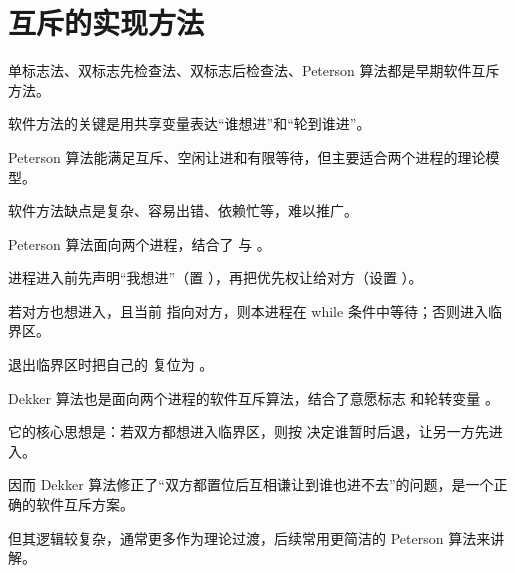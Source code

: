 \section{互斥的实现方法}
\begin{points}
  \item 单标志法、双标志先检查法、双标志后检查法、Peterson 算法都是早期软件互斥方法。
  \item 软件方法的关键是用共享变量表达“谁想进”和“轮到谁进”。
  \item Peterson 算法能满足互斥、空闲让进和有限等待，但主要适合两个进程的理论模型。
  \item 软件方法缺点是复杂、容易出错、依赖忙等，难以推广。
\end{points}

\begin{points}
  \item Peterson 算法面向两个进程，结合了  与 。
  \item 进程进入前先声明“我想进”（置 ），再把优先权让给对方（设置 ）。
  \item 若对方也想进入，且当前  指向对方，则本进程在 while 条件中等待；否则进入临界区。
  \item 退出临界区时把自己的  复位为 。
\end{points}

\begin{points}
  \item Dekker 算法也是面向两个进程的软件互斥算法，结合了意愿标志  和轮转变量 。
  \item 它的核心思想是：若双方都想进入临界区，则按  决定谁暂时后退，让另一方先进入。
  \item 因而 Dekker 算法修正了“双方都置位后互相谦让到谁也进不去”的问题，是一个正确的软件互斥方案。
  \item 但其逻辑较复杂，通常更多作为理论过渡，后续常用更简洁的 Peterson 算法来讲解。
\end{points}


